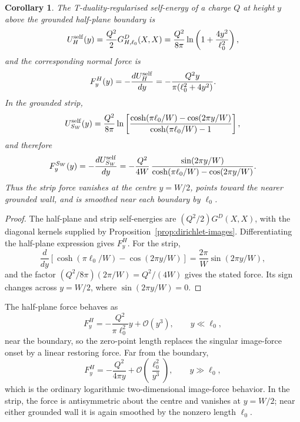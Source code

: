 \documentclass[nopacs,amsmath,amsfonts,amssymb,aps,superscriptaddress]{revtex4}
\newtheorem{corollary}{Corollary}[section]
\begin{document}
\begin{corollary}\label{cor:boundary-self-forces}
The T-duality-regularised self-energy of a charge \(Q\) at height \(y\) above the grounded half-plane boundary is
\begin{equation}
  U_H^{\rm self}(y)=\frac{Q^2}{2}G_{H,\ell_0}^D(X,X)
  =\frac{Q^2}{8\pi}\ln\left(1+\frac{4y^2}{\ell_0^2}\right),
\end{equation}
and the corresponding normal force is
\begin{equation}
  F_y^H(y)=-\frac{dU_H^{\rm self}}{dy}
  =-\frac{Q^2y}{\pi(\ell_0^2+4y^2)}.
\end{equation}
In the grounded strip,
\begin{equation}
  U_{S_W}^{\rm self}(y)=\frac{Q^2}{8\pi}\ln\left[
  \frac{\cosh(\pi\ell_0/W)-\cos(2\pi y/W)}{\cosh(\pi\ell_0/W)-1}\right],
\end{equation}
and therefore
\begin{equation}
  F_y^{S_W}(y)=-\frac{dU_{S_W}^{\rm self}}{dy}
  =-\frac{Q^2}{4W}\,
  \frac{\sin(2\pi y/W)}{\cosh(\pi\ell_0/W)-\cos(2\pi y/W)}.
\end{equation}
Thus the strip force vanishes at the centre \(y=W/2\), points toward the nearer grounded wall, and is smoothed near each boundary by \(\ell_0\).
\end{corollary}

\begin{proof}
The half-plane and strip self-energies are \((Q^2/2)G^D(X,X)\), with the diagonal kernels supplied by Proposition~\ref{prop:dirichlet-images}. Differentiating the half-plane expression gives \(F_y^H\). For the strip,
\begin{equation}
  \frac{d}{dy}\left[\cosh(\pi\ell_0/W)-\cos(2\pi y/W)\right]
  =\frac{2\pi}{W}\sin(2\pi y/W),
\end{equation}
and the factor \((Q^2/8\pi)(2\pi/W)=Q^2/(4W)\) gives the stated force. Its sign changes across \(y=W/2\), where \(\sin(2\pi y/W)=0\).
\end{proof}

The half-plane force behaves as
\begin{equation}
  F_y^H=-\frac{Q^2}{\pi\ell_0^2}y+\mathcal O(y^3),\qquad y\ll\ell_0,
\end{equation}
near the boundary, so the zero-point length replaces the singular image-force onset by a linear restoring force. Far from the boundary,
\begin{equation}
  F_y^H=-\frac{Q^2}{4\pi y}+\mathcal O\!\left(\frac{\ell_0^2}{y^3}\right),\qquad y\gg\ell_0,
\end{equation}
which is the ordinary logarithmic two-dimensional image-force behavior. In the strip, the force is antisymmetric about the centre and vanishes at \(y=W/2\); near either grounded wall it is again smoothed by the nonzero length \(\ell_0\).
\end{document}
